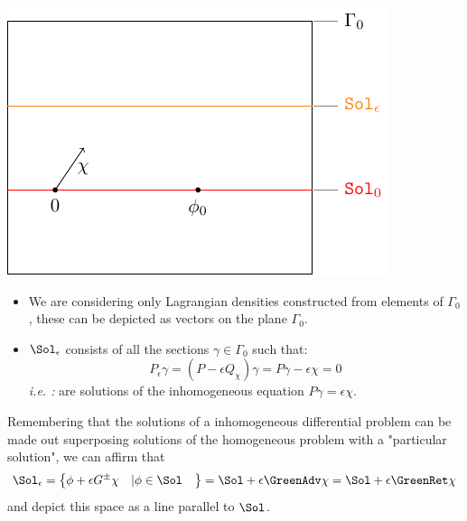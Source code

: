 \documentclass[Main]{subfiles}
\begin{document}
		\vspace{1mm}		
		\begin{minipage}{0.5\textwidth}
			\includegraphics[width=\textwidth]{Pictures/compsupp_GeometricPicture1}
		\end{minipage}
		\begin{minipage}{0.5\textwidth}
			\begin{itemize}
				\item  We are considering only Lagrangian densities constructed from elements of $\Gamma_0$, these can be depicted as vectors on the plane $\Gamma_0$.
				\item 	$\Sol_\epsilon$ consists of all the sections $\gamma \in \Gamma_0$ such that:
					\begin{displaymath}
						P_\epsilon \gamma = ( P  - \epsilon Q_\chi) \gamma = P \gamma - \epsilon \chi = 0
					\end{displaymath}
					\textit{i.e. :} are solutions of the inhomogeneous equation $P \gamma = \epsilon \chi$.
			\end{itemize}
		\end{minipage}
		\vspace{1mm}
		
		Remembering that the solutions of a inhomogeneous differential problem can be made out superposing solutions of the homogeneous problem with a "particular solution", 
		we can affirm that
		\begin{displaymath}
			\Sol_\epsilon = \left\lbrace \phi + \epsilon G^\pm \chi \quad \vert \phi \in \Sol \quad  \right\rbrace =
			 \Sol + \epsilon \GreenAdv \chi = \Sol + \epsilon \GreenRet \chi
		\end{displaymath}
		and depict this space as a line parallel to $\Sol$.
\end{document}
